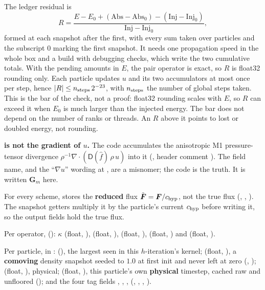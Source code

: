 The ledger residual is
\begin{equation}
  R = \frac{E - E_0 + (\mathrm{Abs} - \mathrm{Abs}_0) - (\mathrm{Inj} - \mathrm{Inj}_0)}
           {\mathrm{Inj} - \mathrm{Inj}_0},
  \label{eq:isrfd-ledger-residual}
\end{equation}
formed at each snapshot after the first, with every sum taken over particles
and the subscript 0 marking the first snapshot. It needs one propagation speed
in the whole box and a build with debugging checks, which write the two
cumulative totals. With the pending amounts in $E$, the pair operator is exact,
so $R$ is float32 rounding only. Each particle updates $u$ and its two
accumulators at most once per step, hence
$|R| \le n_{\rm steps}\,2^{-23}$, with $n_{\rm steps}$ the number of global
steps taken. This is the bar of the check, not a proof: float32 rounding scales
with $E$, so $R$ can exceed it when $E_0$ is much larger than the injected
energy. The bar does not depend on the number of ranks or threads. An $R$ above
it points to lost or doubled energy, not rounding.

\textbf{ is not the gradient of $u$.} The code accumulates the
anisotropic M1 pressure-tensor divergence
$\rho^{-1}\nabla\!\cdot\!(\mathsf{D}(\hat f)\,\rho\, u)$ into it
(, header comment ).
The field name, and the ``$\nabla u$'' wording at
, are a misnomer; the code is the truth. It is
written $\boldsymbol{G}_m$ here.

For every scheme,  stores the \textbf{reduced} flux
$\tilde{\boldsymbol{F}} = \boldsymbol{F}/c_{\rm hyp}$, not the true flux
(, ,
). The snapshot getters multiply it by the
particle's current $c_{\rm hyp}$ before writing it, so the output fields hold the
true flux.

Per operator, 
(): $\kappa$ (float, ),
 (float, ), 
(float, ),  (float, ) and
 (float, ).

Per particle, in : 
(), the largest  seen in this
$h$-iteration's kernel;  (float, ), a
\textbf{comoving} density snapshot seeded to $1.0$ at first init and never left
at zero (, );  (float,
), physical;  (float,
), this particle's own
\textbf{physical} timestep, cached raw and unfloored
(); and the four tag fields
, ,
, 
(, , , ).

